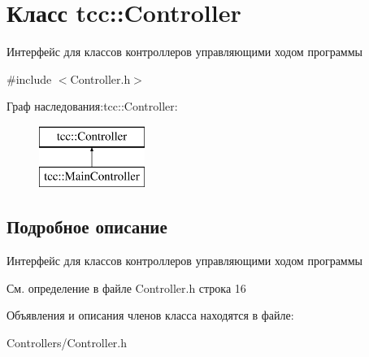 \hypertarget{classtcc_1_1_controller}{}\section{Класс tcc\+:\+:Controller}
\label{classtcc_1_1_controller}


Интерфейс для классов контроллеров управляющими ходом программы  




{\ttfamily \#include $<$Controller.\+h$>$}

Граф наследования\+:tcc\+:\+:Controller\+:\begin{figure}[H]
\begin{center}
\leavevmode
\includegraphics[height=2.000000cm]{classtcc_1_1_controller}
\end{center}
\end{figure}


\subsection{Подробное описание}
Интерфейс для классов контроллеров управляющими ходом программы 

См. определение в файле Controller.\+h строка 16



Объявления и описания членов класса находятся в файле\+:\begin{DoxyCompactItemize}
\item 
Controllers/Controller.\+h\end{DoxyCompactItemize}
